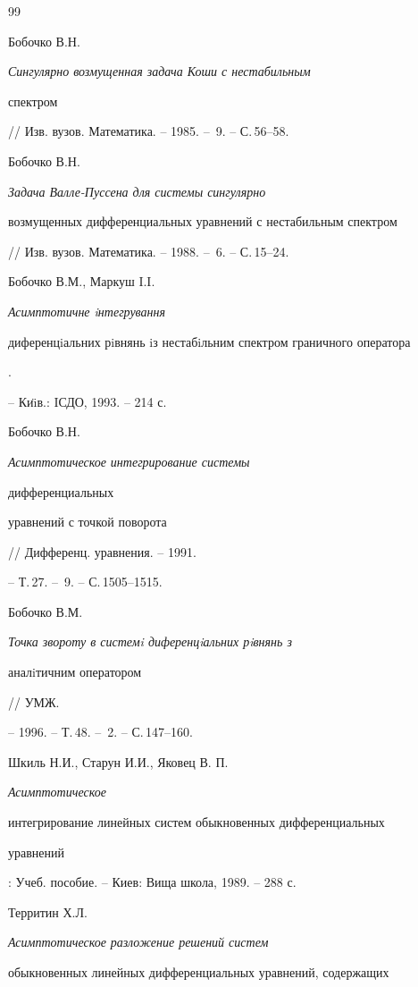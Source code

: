  


\begin{thebibliography}{99} 


 




Бобочко В.Н. {\em Сингулярно возмущенная задача Коши с нестабильным 


спектром} // Изв. вузов. Математика. -- 1985. -- \No\,9. -- С.\,56--58. 




Бобочко В.Н. {\em Задача Валле-Пуссена для системы сингулярно 


возмущенных дифференциальных уравнений с нестабильным спектром} 


// Изв. вузов. Математика. -- 1988. -- \No\,6. -- С.\,15--24. 




Бобочко В.М., Маркуш I.I. {\em Асимптотичне iнтегрування 


диференцiальних рiвнянь iз нестабiльним спектром граничного оператора}. 


-- Ки\"\i{}в.: IСДО, 1993. -- 214 с. 




Бобочко В.Н. {\em Асимптотическое интегрирование системы 


дифференциальных 


уравнений с точкой поворота} // Дифференц. уравнения. -- 1991. 


-- Т.\,27. -- \No\,9. -- С.\,1505--1515. 




Бобочко В.М. {\em Точка звороту в системi диференцiальних рiвнянь з 


аналiтичним оператором} // УМЖ. 


-- 1996. -- Т.\,48. -- \No\,2. -- С.\,147--160. 




Шкиль Н.И., Старун И.И., Яковец В. П. {\em Асимптотическое 


интегрирование линейных систем обыкновенных дифференциальных 


уравнений}: Учеб. пособие. -- Киев: Вища школа, 1989. -- 288 с. 




Территин Х.Л. {\em Асимптотическое разложение решений систем 


обыкновенных линейных дифференциальных уравнений, содержащих 


}
\end{thebibliography}
